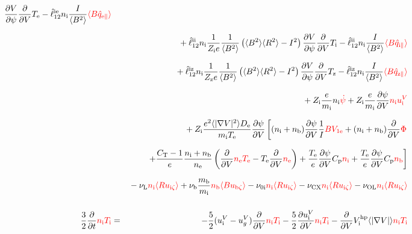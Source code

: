 \documentclass[11pt]{article}
\def\r#1{{\rm#1}}
\def\aves#1{\langle#1\rangle}
\def\dd#1#2{\frac{\partial #1}{\partial #2}}
\def\para{\parallel}
\def\ddV{\frac{\partial}{\partial V}}
\def\ddt{\frac{\partial}{\partial t}}
\def\mi{m_\r{i}}
\def\mb{m_\r{b}}
\def\nee{n_\r{e}}
\def\ni{n_\r{i}}
\def\nb{n_\r{b}}
\def\Te{T_\r{e}}
\def\Ti{T_\r{i}}
\def\Tz{T_\r{z}}
\def\Zi{Z_\r{i}}
\def\Zz{Z_\r{z}}
\def\uzt#1{u_{\r{#1}\zeta}}
\def\upara#1{u_{\r{#1}\para}}
\def\qhatpara#1{\hat{q}_{\r{#1}\para}}
\def\uV#1{u_\r{#1}^V}
\def\ugV{u_{g}^V}
\def\De{D_\r{e}}
\def\nun#1{\nu_\r{0#1}}
\def\bri{\aves{B^2}\aves{R^2} - I^2}
\def\nuL{\nu_\r{L}}
\def\nuCX{\nu_\r{CX}}
\def\nub{\nu_\r{b}}
\def\nuOL{\nu_\r{OL}}
\def\red#1{\textcolor{red}{#1}}
\begin{document}
\begin{eqnarray}
    \dd{V}{\psi} \ddV \Te
  - \hat{\ell}_{12}^\r{ie} \ni \frac{I}{\aves{B^2}} \red{\aves{B \qhatpara{e}}}
\nonumber\\[2.5mm]&&{}
  + \hat{\ell}_{12}^\r{ii} \ni \frac{1}{\Zi e} \frac{1}{\aves{B^2}} \left( \bri \right)
    \dd{V}{\psi} \ddV \Ti
  - \hat{\ell}_{12}^\r{ii} \ni \frac{I}{\aves{B^2}} \red{\aves{B \qhatpara{i}}}
\nonumber\\[2.5mm]&&{}
  + \hat{\ell}_{12}^\r{iz} \ni \frac{1}{\Zz e} \frac{1}{\aves{B^2}} \left( \bri \right)
    \dd{V}{\psi} \ddV \Tz
  - \hat{\ell}_{12}^\r{iz} \ni \frac{I}{\aves{B^2}} \red{\aves{B \qhatpara{z}}}
\nonumber\\[2.5mm]&&{}
%
  + \Zi \frac{e}{\mi}              \ni \red{\dot{\psi}}
%
  + \Zi \frac{e}{\mi} \dd{\psi}{V} \red{\ni \uV{i}}
%
\nonumber\\[2.5mm]&&{}
%
%
  + \Zi \frac{e^2 \aves{|\nabla V|^2} \De}{\mi\Te} \dd{\psi}{V} 
  \left[   (\ni + \nb) \dd{\psi}{V} \frac{1}{I} \red{B V_{1\r{e}}}
         + (\ni + \nb) \ddV \red{\Phi} \right.
\nonumber\\[2.5mm]&&{}
  \left. + \frac{C_\r{T}-1}{e} \frac{\ni + \nb}{\nee}
           \left( \ddV \red{\nee \Te} - \Te \ddV \red{\nee} \right)
         + \frac{\Te}{e} \dd{\psi}{V} C_\r{p} \red{\ni}
         + \frac{\Te}{e} \dd{\psi}{V} C_\r{p} \red{\nb} \right]
\nonumber\\[2.5mm]&&{}
%
  - \nuL  \red{\ni \aves{R \uzt{i}}}
%
  + \nub  \frac{\mb}{\mi} \red{\nb \aves{B \uzt{b}}}
%
  - \nun{i} \red{\ni \aves{R \uzt{i}}}
%
  - \nuCX \red{\ni \aves{R \uzt{i}}}
%
  - \nuOL \red{\ni \aves{R \uzt{i}}}
\\[5mm]
  \frac{3}{2} \ddt \red{\ni \Ti}  &=& 
%
  - \frac{5}{2} ( \uV{i} - \ugV ) \ddV \red{\ni \Ti}
%
  - \frac{5}{2} \dd{\uV{i}}{V} \red{\ni \Ti}
%
  - \ddV V_\r{i}^\r{hp} \aves{|\nabla V|} \red{\ni \Ti}
\nonumber\\[2.5mm]&&{}

\end{eqnarray}
\end{document}
